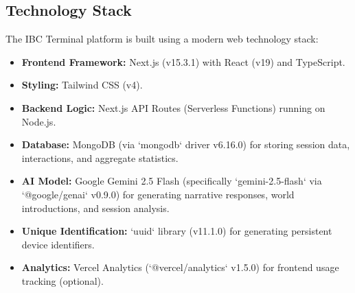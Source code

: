 \documentclass{article}
\begin{document}
\subsection{Technology Stack}
The IBC Terminal platform is built using a modern web technology stack:
\begin{itemize}
    \item \textbf{Frontend Framework:} Next.js (v15.3.1) with React (v19) and TypeScript.
    \item \textbf{Styling:} Tailwind CSS (v4).
    \item \textbf{Backend Logic:} Next.js API Routes (Serverless Functions) running on Node.js.
    \item \textbf{Database:} MongoDB (via `mongodb` driver v6.16.0) for storing session data, interactions, and aggregate statistics.
    \item \textbf{AI Model:} Google Gemini 2.5 Flash (specifically `gemini-2.5-flash` via `@google/genai` v0.9.0) for generating narrative responses, world introductions, and session analysis.
    \item \textbf{Unique Identification:} `uuid` library (v11.1.0) for generating persistent device identifiers.
    \item \textbf{Analytics:} Vercel Analytics (`@vercel/analytics` v1.5.0) for frontend usage tracking (optional).
\end{itemize}
\end{document}
